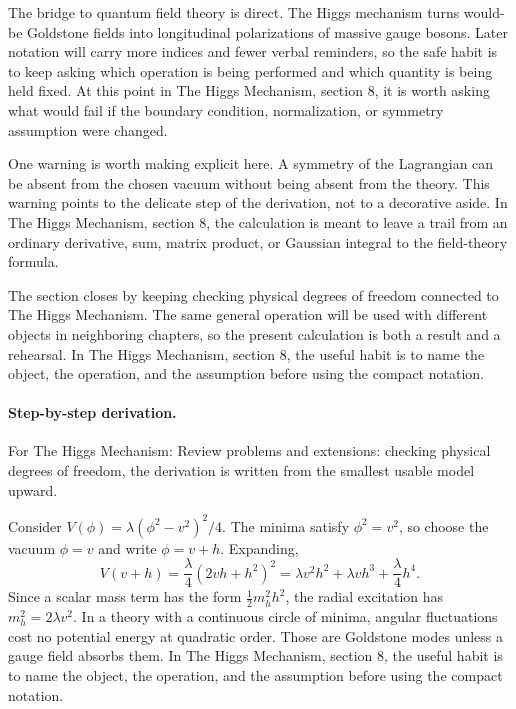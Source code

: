 The bridge to quantum field theory is direct.  The Higgs mechanism turns would-be Goldstone fields into longitudinal polarizations of massive gauge bosons.  Later notation will carry more indices and fewer verbal reminders, so the safe habit is to keep asking which operation is being performed and which quantity is being held fixed.  At this point in The Higgs Mechanism, section 8, it is worth asking what would fail if the boundary condition, normalization, or symmetry assumption were changed.

One warning is worth making explicit here.  A symmetry of the Lagrangian can be absent from the chosen vacuum without being absent from the theory.  This warning points to the delicate step of the derivation, not to a decorative aside.  In The Higgs Mechanism, section 8, the calculation is meant to leave a trail from an ordinary derivative, sum, matrix product, or Gaussian integral to the field-theory formula.

The section closes by keeping checking physical degrees of freedom connected to The Higgs Mechanism.  The same general operation will be used with different objects in neighboring chapters, so the present calculation is both a result and a rehearsal.  In The Higgs Mechanism, section 8, the useful habit is to name the object, the operation, and the assumption before using the compact notation.



\paragraph{Step-by-step derivation.}

For The Higgs Mechanism: Review problems and extensions: checking physical degrees of freedom, the derivation is written from the smallest usable model upward.

Consider \(V(\phi)=\lambda(\phi^2-v^2)^2/4\).  The minima satisfy \(\phi^2=v^2\), so choose the vacuum \(\phi=v\) and write \(\phi=v+h\).  Expanding,
\[
  V(v+h)=\frac{\lambda}{4}(2vh+h^2)^2
  =\lambda v^2h^2+\lambda vh^3+\frac{\lambda}{4}h^4.
\]
Since a scalar mass term has the form \(\frac12m_h^2h^2\), the radial excitation has \(m_h^2=2\lambda v^2\).  In a theory with a continuous circle of minima, angular fluctuations cost no potential energy at quadratic order.  Those are Goldstone modes unless a gauge field absorbs them.  In The Higgs Mechanism, section 8, the useful habit is to name the object, the operation, and the assumption before using the compact notation.

